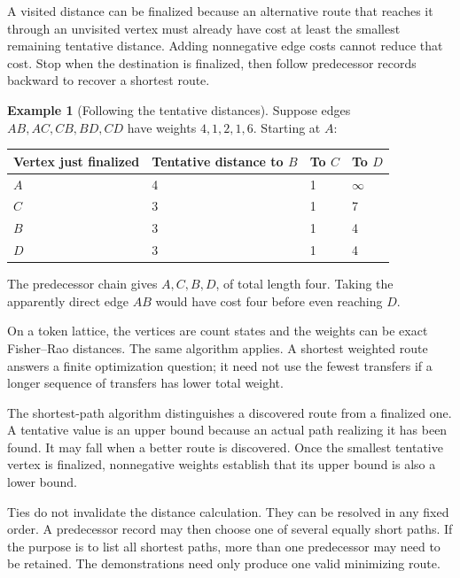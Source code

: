 \documentclass[11pt,oneside,openany]{book}
\theoremstyle{definition}
\newtheorem{example}{Example}[chapter]
\theoremstyle{remark}
\numberwithin{equation}{chapter}
\begin{document}
A visited distance can be finalized because an alternative route that reaches it through an unvisited vertex must already have cost at least the smallest remaining tentative distance. Adding nonnegative edge costs cannot reduce that cost. Stop when the destination is finalized, then follow predecessor records backward to recover a shortest route.

\begin{example}[Following the tentative distances]

Suppose edges \(AB,AC,CB,BD,CD\) have weights \(4,1,2,1,6\). Starting at \(A\):

\begin{longtable}[]{@{}llll@{}}
\toprule\noalign{}
Vertex just finalized & Tentative distance to \(B\) & To \(C\) & To \(D\) \\
\midrule\noalign{}
\endhead
\bottomrule\noalign{}
\endlastfoot
\(A\) & 4 & 1 & \(\infty\) \\
\(C\) & 3 & 1 & 7 \\
\(B\) & 3 & 1 & 4 \\
\(D\) & 3 & 1 & 4 \\
\end{longtable}

The predecessor chain gives \(A,C,B,D\), of total length four. Taking the apparently direct edge \(AB\) would have cost four before even reaching \(D\).

\end{example}

On a token lattice, the vertices are count states and the weights can be exact Fisher--Rao distances. The same algorithm applies. A shortest weighted route answers a finite optimization question; it need not use the fewest transfers if a longer sequence of transfers has lower total weight.

The shortest-path algorithm distinguishes a discovered route from a finalized one. A tentative value is an upper bound because an actual path realizing it has been found. It may fall when a better route is discovered. Once the smallest tentative vertex is finalized, nonnegative weights establish that its upper bound is also a lower bound.

Ties do not invalidate the distance calculation. They can be resolved in any fixed order. A predecessor record may then choose one of several equally short paths. If the purpose is to list all shortest paths, more than one predecessor may need to be retained. The demonstrations need only produce one valid minimizing route.
\end{document}
